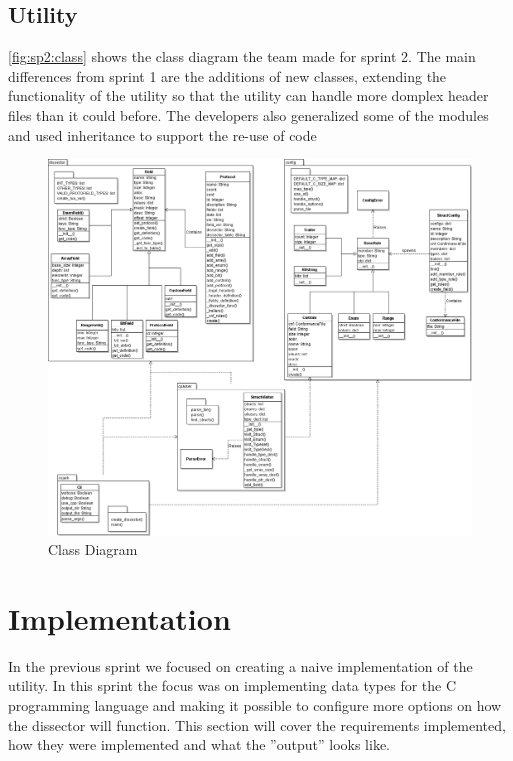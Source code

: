 \subsection{Utility}
\autoref{fig:sp2:class} shows the class diagram the team made for sprint 2. The main differences from sprint 1 are the additions of new classes, extending the functionality of the utility so that the utility can handle more domplex header files than it could before. The developers also generalized some of the modules and used inheritance to support the re-use of code 
\begin{figure}[!htb]
	\center
	\includegraphics[width=\textwidth]{./sprints/img/class_diagram_s2}
	\caption{Class Diagram\label{fig:sp2:class}}
\end{figure}



\section{Implementation}

In the previous sprint we focused on creating a naive implementation of the 
utility. In this sprint the focus was on implementing data types for the 
C programming language and making it possible to configure more options on how 
the dissector will function. This section will cover the requirements 
implemented, how they were implemented and what the ''output'' looks like.

